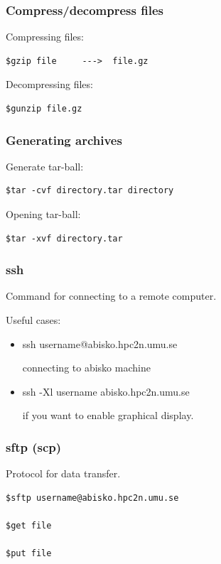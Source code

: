 \begin{frame}[fragile]
	\frametitle{Compress/decompress files}

Compressing files:

\begin{verbatim}
$gzip file     --->  file.gz
\end{verbatim}

Decompressing files:

\begin{verbatim}
$gunzip file.gz
\end{verbatim}

\end{frame}


\begin{frame}[fragile]
	\frametitle{Generating archives}

Generate tar-ball:

\begin{verbatim}
$tar -cvf directory.tar directory 
\end{verbatim}

Opening tar-ball:

\begin{verbatim}
$tar -xvf directory.tar
\end{verbatim}

\end{frame}


\begin{frame}
	\frametitle{ ssh}
Command for connecting to a remote computer.

Useful cases:
	\begin{itemize}
         \item ssh username@abisko.hpc2n.umu.se

         connecting to abisko machine

         \item ssh -Xl username abisko.hpc2n.umu.se

        if you want to enable graphical display.

	\end{itemize}
\end{frame}

\begin{frame}[fragile]
	\frametitle{ sftp (scp)}

Protocol for data transfer.
\begin{verbatim}
$sftp username@abisko.hpc2n.umu.se

$get file

$put file

\end{verbatim}
\end{frame}

